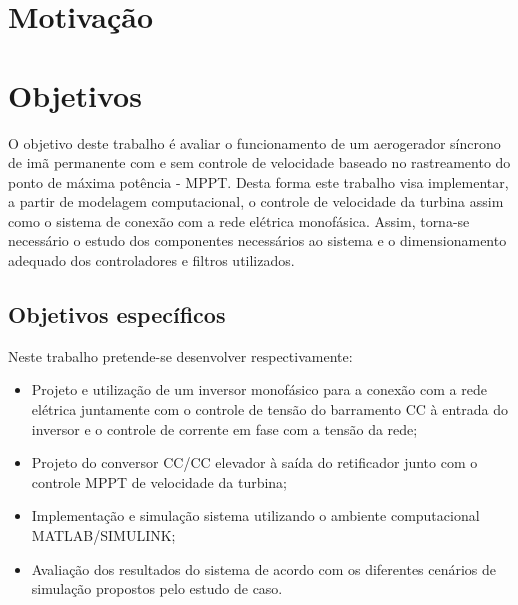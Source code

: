%




\section{Motivação}  


\section{Objetivos}

O objetivo deste trabalho é avaliar o funcionamento de um aerogerador síncrono de imã permanente com e sem controle de velocidade baseado no rastreamento do ponto de máxima potência - MPPT. Desta forma este trabalho visa implementar, a partir de modelagem computacional, o controle de velocidade da turbina assim como o sistema de conexão com a rede elétrica monofásica. Assim, torna-se necessário o estudo dos componentes necessários ao sistema e o dimensionamento adequado dos controladores e filtros utilizados.


\subsection{Objetivos específicos}

Neste trabalho pretende-se desenvolver respectivamente:

\begin{itemize}
	\item Projeto e utilização de um inversor monofásico para a conexão com a rede elétrica juntamente com o controle de tensão do barramento CC à entrada do inversor e o controle de corrente em fase com a tensão da rede;
	\item Projeto do conversor CC/CC elevador à saída do retificador junto com o controle MPPT de velocidade da turbina;
	
	\item  Implementação e simulação sistema utilizando o ambiente computacional MATLAB/SIMULINK\texttrademark;
	
	\item Avaliação dos resultados do sistema de acordo com os diferentes cenários de simulação propostos pelo estudo de caso.
\end{itemize}


